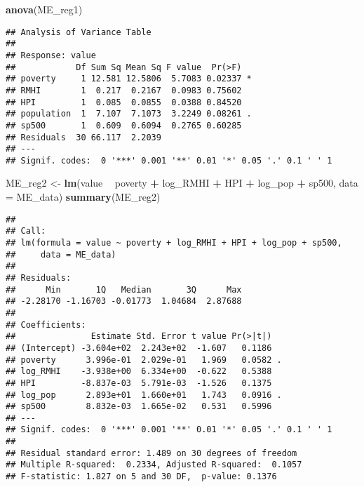 \documentclass[
]{article}
\newenvironment{Shaded}{\begin{snugshade}}{\end{snugshade}}
\newcommand{\DataTypeTok}[1]{\textcolor[rgb]{0.13,0.29,0.53}{#1}}
\newcommand{\KeywordTok}[1]{\textcolor[rgb]{0.13,0.29,0.53}{\textbf{#1}}}
\newcommand{\NormalTok}[1]{#1}
\newcommand{\OperatorTok}[1]{\textcolor[rgb]{0.81,0.36,0.00}{\textbf{#1}}}
\newcommand{\StringTok}[1]{\textcolor[rgb]{0.31,0.60,0.02}{#1}}
\begin{document}
\begin{Shaded}
\begin{Highlighting}[]
\KeywordTok{anova}\NormalTok{(ME_reg1)}
\end{Highlighting}
\end{Shaded}

\begin{verbatim}
## Analysis of Variance Table
## 
## Response: value
##            Df Sum Sq Mean Sq F value  Pr(>F)  
## poverty     1 12.581 12.5806  5.7083 0.02337 *
## RMHI        1  0.217  0.2167  0.0983 0.75602  
## HPI         1  0.085  0.0855  0.0388 0.84520  
## population  1  7.107  7.1073  3.2249 0.08261 .
## sp500       1  0.609  0.6094  0.2765 0.60285  
## Residuals  30 66.117  2.2039                  
## ---
## Signif. codes:  0 '***' 0.001 '**' 0.01 '*' 0.05 '.' 0.1 ' ' 1
\end{verbatim}

\begin{Shaded}
\begin{Highlighting}[]
\NormalTok{ME_reg2 <-}\StringTok{ }\KeywordTok{lm}\NormalTok{(value }\OperatorTok{~}\StringTok{ }\NormalTok{poverty }\OperatorTok{+}\StringTok{ }\NormalTok{log_RMHI }\OperatorTok{+}\StringTok{ }\NormalTok{HPI }\OperatorTok{+}\StringTok{ }\NormalTok{log_pop }\OperatorTok{+}\StringTok{ }\NormalTok{sp500, }\DataTypeTok{data =}\NormalTok{ ME_data)}
\KeywordTok{summary}\NormalTok{(ME_reg2)}
\end{Highlighting}
\end{Shaded}

\begin{verbatim}
## 
## Call:
## lm(formula = value ~ poverty + log_RMHI + HPI + log_pop + sp500, 
##     data = ME_data)
## 
## Residuals:
##      Min       1Q   Median       3Q      Max 
## -2.28170 -1.16703 -0.01773  1.04684  2.87688 
## 
## Coefficients:
##               Estimate Std. Error t value Pr(>|t|)  
## (Intercept) -3.604e+02  2.243e+02  -1.607   0.1186  
## poverty      3.996e-01  2.029e-01   1.969   0.0582 .
## log_RMHI    -3.938e+00  6.334e+00  -0.622   0.5388  
## HPI         -8.837e-03  5.791e-03  -1.526   0.1375  
## log_pop      2.893e+01  1.660e+01   1.743   0.0916 .
## sp500        8.832e-03  1.665e-02   0.531   0.5996  
## ---
## Signif. codes:  0 '***' 0.001 '**' 0.01 '*' 0.05 '.' 0.1 ' ' 1
## 
## Residual standard error: 1.489 on 30 degrees of freedom
## Multiple R-squared:  0.2334, Adjusted R-squared:  0.1057 
## F-statistic: 1.827 on 5 and 30 DF,  p-value: 0.1376
\end{verbatim}
\end{document}
